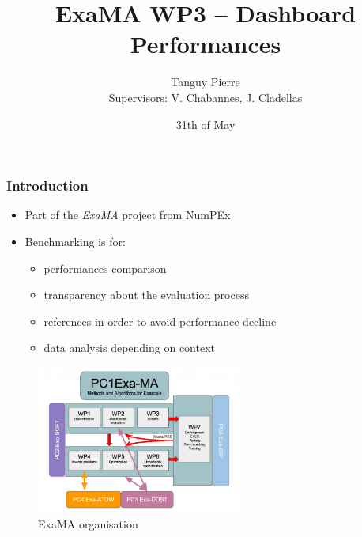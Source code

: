 \documentclass[10pt]{beamer}
\title{\textbf{ExaMA WP3 -- Dashboard Performances}}
\author[Tanguy PIERRE]{Tanguy Pierre\\[1cm] \small{Supervisors: V. Chabannes, J. Cladellas}}
\institute{University of Strasbourg}
\date{31th of May}
\begin{document}
\frame{\titlepage}


\begin{frame}
    \frametitle{\textbf{Introduction}}

    \begin{itemize}
        \addtolength{\itemsep}{10pt}
        \item Part of the \textit{ExaMA} project from NumPEx 
        \item Benchmarking is for:
        \begin{itemize}
            \item performances comparison
            \item transparency about the evaluation process
            \item references in order to avoid performance decline
            \item data analysis depending on context
        \end{itemize}
    \end{itemize}

    \begin{figure}
        \centering
        \includegraphics[width=0.6\textwidth]{../illustrations/ExaMa-orga.png}
        \caption{ExaMA organisation}
    \end{figure}
\end{frame}
\end{document}
